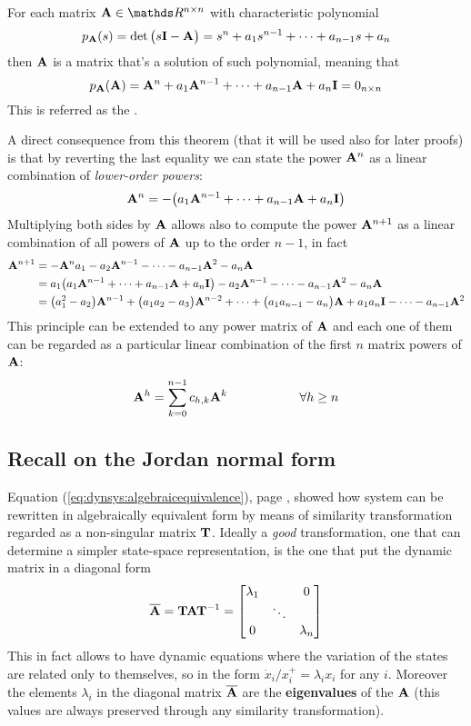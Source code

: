 	\begin{theorem}
		For each matrix $\A \in \mathds R^{n\times n}$ with characteristic polynomial
		\[ p_{\mathbf{A}}(s) = \det\big(s\mathbf{I} - \mathbf{A}\big) = s^n + a_1 s^{n-1} + \dots + a_{n-1} s + a_n \]
		then $\mathbf{A}$ is a matrix that's a solution of such polynomial, meaning that
		\[ p_{\mathbf{A}}(\mathbf{A}) = \mathbf{A}^n + a_1 \mathbf{A}^{n-1} + \dots + a_{n-1} \mathbf{A} + a_n \mathbf{I} = 0_{n\times n} \]
		This is referred as the .		
	\end{theorem}
	A direct consequence from this theorem (that it will be used also for later proofs) is that by reverting the last equality we can state the power $\mathbf{A}^n$ as a linear combination of \textit{lower-order powers}:
	\[ \mathbf{A}^n = -\big(a_1 \mathbf{A}^{n-1} + \dots + a_{n-1} \mathbf{A} + a_n \mathbf{I} \big) \]
	Multiplying both sides by $\mathbf{A}$ allows also to compute the power $\mathbf{A}^{n+1}$ as a linear combination of all powers of $\mathbf{A}$ up to the order $n-1$, in fact
	\begin{align*}
		\mathbf{A}^{n+1} & = -\mathbf{A}^n a_1 - a_2 \mathbf{A}^{n-1} - \dots - a_{n-1}\mathbf{A}^2 - a_n \mathbf{A} \\
		& = a_1 \big(a_1 \mathbf{A}^{n-1} + \dots + a_{n-1} \mathbf{A} + a_n \mathbf{I} \big) - a_2 \mathbf{A}^{n-1} - \dots - a_{n-1}\mathbf{A}^2 - a_n \mathbf{A} \\
		& = \big(a_1^2- a_2\big) \mathbf{A}^{n-1} + \big(a_1 a_2 - a_3\big) \mathbf{A}^{n-2} + \dots + \big(a_1 a_{n-1} - a_n\big) \mathbf{A} + a_1 a_n \mathbf{I} - \dots - a_{n-1} \mathbf{A}^2
	\end{align*}
	This principle can be extended to any power matrix of $\mathbf{A}$ and each one of them can be regarded as a particular linear combination of the first $n$ matrix powers of $\mathbf{A}$:
	\begin{equation}
		\mathbf{A}^h = \sum_{k=0}^{n-1} c_{h,k} \mathbf{A}^k \hspace{2cm} \forall h \geq n
	\end{equation}
	
	
\subsection{Recall on the Jordan normal form}
	Equation (\ref{eq:dynsys:algebraicequivalence}), page \pageref{eq:dynsys:algebraicequivalence}, showed how system can be rewritten in algebraically equivalent form by means of similarity transformation regarded as a non-singular matrix $\mathbf{T}$. Ideally a \textit{good} transformation, one that can determine a simpler state-space representation, is the one that put the  dynamic matrix in a diagonal form
	\begin{equation} \label{eq:sol:temp3}
		\overline {\mathbf{A}}= \mathbf{T} \mathbf{A} \mathbf{T}^{-1} = \begin{bmatrix} \lambda_1 & & 0 \\ & \ddots \\ 0 & & \lambda_n \end{bmatrix}
	\end{equation}
	This in fact allows to have dynamic equations where the variation of the states are related only to themselves, so in the form $\dot x_i/x_i^+ = \lambda_i x_i$ for any $i$. Moreover the elements $\lambda_i$ in the diagonal matrix $\overline {\mathbf{A}}$ are the \textbf{eigenvalues} of the $\mathbf{A}$ (this values are always preserved through any similarity transformation). 
	
